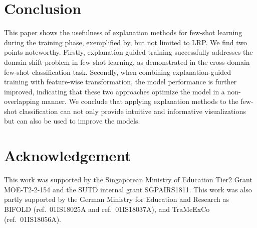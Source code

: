 \documentclass[a4paper,conference]{IEEEtran}
\begin{document}
\section{Conclusion}
This paper shows the usefulness of explanation methods for few-shot learning during the training phase, exemplified by, but not limited to LRP. We find two points noteworthy.
Firstly, explanation-guided training successfully addresses the domain shift problem in few-shot learning, as demonstrated in the cross-domain few-shot classification task. Secondly, when combining explanation-guided training with feature-wise transformation, the model performance is further improved, indicating that these two approaches optimize the model in a non-overlapping manner. We conclude that applying explanation methods to the few-shot classification can not only provide intuitive and informative visualizations but can also be used to improve the models.

\section{Acknowledgement}
This work was supported by the Singaporean Ministry of Education Tier2 Grant MOE-T2-2-154 and the SUTD internal grant SGPAIRS1811.
This work was also partly supported by the German Ministry for Education and Research as BIFOLD (ref.\ 01IS18025A and ref.\ 01IS18037A),
and TraMeExCo (ref.\ 01IS18056A).



\end{document}
